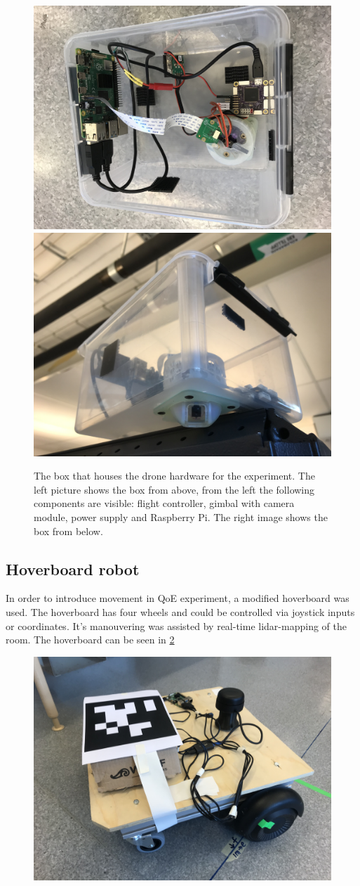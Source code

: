 \documentclass[nofilelist]{cslthse-msc}
\begin{document}
\begin{figure}[htp]
   \centering
   \includegraphics[width=.47\textwidth]{images/drone-box-1.jpg}\hfill
   \includegraphics[width=.47\textwidth]{images/drone-box-2.jpg}
   \caption{The box that houses the drone hardware for the experiment. The left picture shows the box from above, from the left the following components are visible: flight controller, gimbal with camera module, power supply and Raspberry Pi. The right image shows the box from below.}
   \label{fig:drone-setup}
\end{figure}

\subsection{Hoverboard robot}
In order to introduce movement in QoE experiment, a modified hoverboard was used. The hoverboard has four wheels and could be controlled via joystick inputs or coordinates. It's manouvering was assisted by real-time lidar-mapping of the room. The hoverboard can be seen in \ref{fig:hoverboard}

\begin{figure}[!hbt]
   \centering
   \includegraphics[scale=0.07]{images/hoverboard.jpg} 
   \caption{}
   \label{fig:hoverboard}
\end{figure}
\end{document}
